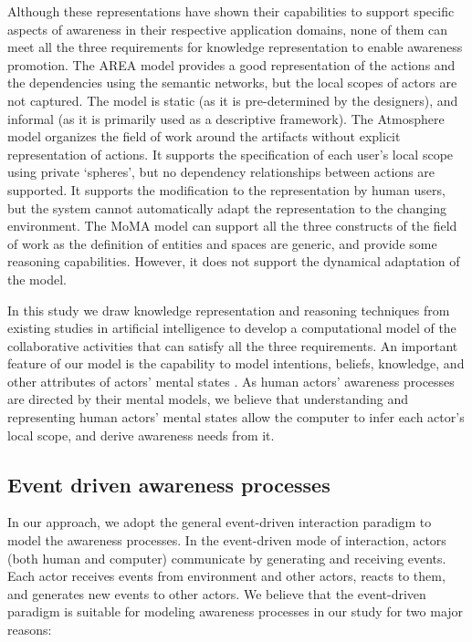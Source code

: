 Although these representations have shown their capabilities to support specific aspects of awareness in their respective application domains, none of them can meet all the three requirements for knowledge representation to enable awareness promotion. The AREA model provides a good representation of the actions and the dependencies using the semantic networks, but the local scopes of actors are not captured. The model is static (as it is pre-determined by the designers), and informal (as it is primarily used as a descriptive framework). The Atmosphere model organizes the field of work around the artifacts without explicit representation of actions. It supports the specification of each user's local scope using private `spheres', but no dependency relationships between actions are supported. It supports the modification to the representation by human users, but the system cannot automatically adapt the representation to the changing environment. The MoMA model can support all the three constructs of the field of work as the definition of entities and spaces are generic, and provide some reasoning capabilities. However, it does not support the dynamical adaptation of the model.

In this study we draw knowledge representation and reasoning techniques from existing studies in artificial intelligence to develop a computational model of the collaborative activities that can satisfy all the three requirements. An important feature of our model is the capability to model intentions, beliefs, knowledge, and other attributes of actors' mental states \cite{grosz1996collaborative}. As human actors' awareness processes are directed by their mental models, we believe that understanding and representing human actors' mental states allow the computer to infer each actor's local scope, and derive awareness needs from it. 

\subsection{Event driven awareness processes} %
\label{sub:event_driven_awareness_processes}
In our approach, we adopt the general event-driven interaction paradigm \cite{Etzion2010} to model the awareness processes. In the event-driven mode of interaction, actors (both human and computer) communicate by generating and receiving events. Each actor receives events from environment and other actors, reacts to them, and generates new events to other actors. We believe that the event-driven paradigm is suitable for modeling awareness processes in our study for two major reasons:


